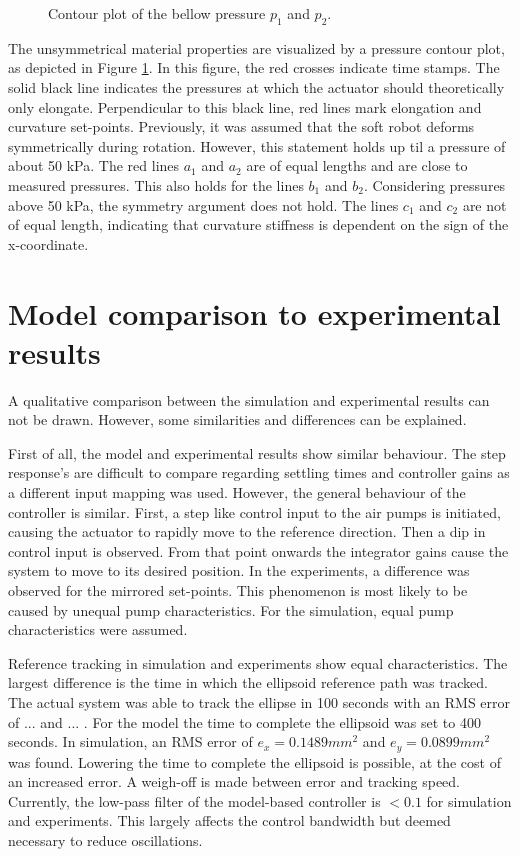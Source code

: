 \begin{figure}[H]
\begin{minipage}[b]{0.49\linewidth}
    \caption{Contour plot of the bellow pressure $p_1$ and $p_2$.}
    \label{fig5:pressureellips}
    \end{minipage} 
\end{figure}

The unsymmetrical material properties are visualized by a pressure contour plot, as depicted in Figure \ref{fig5:pressureellips}. In this figure, the red crosses indicate time stamps. The solid black line indicates the pressures at which the actuator should theoretically only elongate. Perpendicular to this black line, red lines mark elongation and curvature set-points. Previously, it was assumed that the soft robot deforms symmetrically during rotation. However, this statement holds up til a pressure of about 50 kPa. The red lines $a_1$ and $a_2$ are of equal lengths and are close to measured pressures. This also holds for the lines $b_1$ and $b_2$. Considering pressures above 50 kPa, the symmetry argument does not hold. The lines $c_1$ and $c_2$ are not of equal length, indicating that curvature stiffness is dependent on the sign of the x-coordinate. 



\section{Model comparison to experimental results}

A qualitative comparison between the simulation and experimental results can not be drawn. However, some similarities and differences can be explained. 

First of all, the model and experimental results show similar behaviour. The step response's are difficult to compare regarding settling times and controller gains as a different input mapping was used. However, the general behaviour of the controller is similar. First, a step like control input to the air pumps is initiated, causing the actuator to rapidly move to the reference direction. Then a dip in control input is observed. From that point onwards the integrator gains cause the system to move to its desired position. In the experiments, a difference was observed for the mirrored set-points. This phenomenon is most likely to be caused by unequal pump characteristics. For the simulation, equal pump characteristics were assumed. 

Reference tracking in simulation and experiments show equal characteristics. The largest difference is the time in which the ellipsoid reference path was tracked. The actual system was able to track the ellipse in 100 seconds with an RMS error of ... and ... . For the model the time to complete the ellipsoid was set to 400 seconds. In simulation, an RMS error of $e_x = 0.1489 mm^2$ and $e_y = 0.0899 mm^2$ was found. Lowering the time to complete the ellipsoid is possible, at the cost of an increased error. A weigh-off is made between error and tracking speed. Currently, the low-pass filter of the model-based controller is $<0.1$ for simulation and experiments. This largely affects the control bandwidth but deemed necessary to reduce oscillations. 
